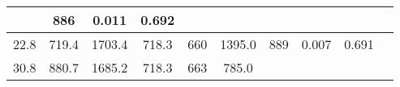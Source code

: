 \documentclass[a4paper,10pt]{article}
\begin{document}
\begin{longtable}{
     |
%    
    c|
%    
    c|
%    
    c|
%    
    c|
%    
    c|
%    
    c|
%    
    c|
%    
    c|
%    
    c|
%    
    c|
%    
    }
%        
        & 886
%        

%        

%        
        & 0.011
%        

%        

%        
        & 0.692
%        

%        
        \\
        \hline

        

%        

%        
        22.8
%        

%        

%        
        & 719.4
%        

%        

%        
        & 1703.4
%        

%        

%        
        & 718.3
%        

%        

%        
        & 660
%        

%        

%        
        & 1395.0
%        

%        

%        
        & 889
%        

%        

%        
        & 0.007
%        

%        

%        
        & 0.691
%        

%        
        \\
        \hline

        

%        

%        
        30.8
%        

%        

%        
        & 880.7
%        

%        

%        
        & 1685.2
%        

%        

%        
        & 718.3
%        

%        

%        
        & 663
%        

%        

%        
        & 785.0
%        

%        


\end{longtable}
\end{document}
